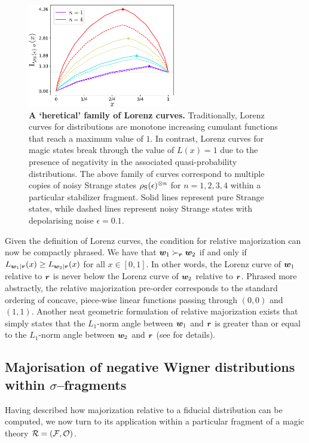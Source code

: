 \documentclass[pra,
aps,
twocolumn,
superscriptaddress,
groupedaddress,
nofootinbib,
reprint
]{revtex4-1}
\begin{document}
\begin{figure}
    \centering
    \includegraphics[height=4.5cm]{figs/lc_strange.pdf}
    \caption{\textbf{A `heretical' family of Lorenz curves.} Traditionally, Lorenz curves for distributions are monotone increasing cumulant functions that reach a maximum value of $1$. In contrast, Lorenz curves for magic states break through the value of $L(x)=1$ due to the presence of negativity in the associated quasi-probability distributions. The above family of curves correspond to multiple copies of noisy Strange states $\rho_{\rm{S}}(\epsilon)^{\otimes n}$ for $n=1,2,3,4$ within a particular stabilizer fragment. Solid lines represent pure Strange states, while dashed lines represent noisy Strange states with depolarising noise $\epsilon = 0.1$.
    }
    \label{fig:lcs}
\end{figure}

Given the definition of Lorenz curves, the condition for relative majorization can now be compactly phrased. We have that $\boldsymbol{w}_1 \succ_{\boldsymbol{r}} \boldsymbol{w}_2$ if and only if $L_{\boldsymbol{w}_1 | \boldsymbol{r}} (x) \ge L_{\boldsymbol{w}_2 | \boldsymbol{r}}(x)$ for all $x \in [0,1]$. In other words, the Lorenz curve of $\boldsymbol{w}_1$ relative to $\boldsymbol{r}$ is never below the Lorenz curve of $\boldsymbol{w}_2$ relative to $\boldsymbol{r}$. Phrased more abstractly, the relative majorization pre-order corresponds to the standard ordering of concave, piece-wise linear functions passing through $(0,0)$ and $(1,1)$. Another neat geometric formulation of relative majorization exists that simply states that the $L_1$-norm angle between $\boldsymbol{w}_1$ and $\boldsymbol{r}$ is greater than or equal to the $L_1$-norm angle between $\boldsymbol{w}_2$ and $\boldsymbol{r}$ (see \ddd{[CITE]} for details).

\subsection{Majorisation of negative Wigner distributions within $\sigma$--fragments}\label{sec:major_frag}

Having described how majorization relative to a fiducial distribution can be computed, we now turn to its application within a particular fragment of a magic theory $\mathcal{R}= (\mathcal{F}, \mathcal{O})$.
\end{document}
